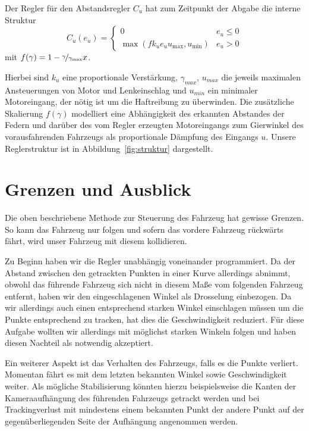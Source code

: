 \documentclass[10pt]{article}
\begin{document}
    Der Regler für den Abstandsregler $C_{u}$ hat zum Zeitpunkt der Abgabe die interne Struktur \[
    C_{u}(e_{u}) = \begin{cases} 0 & e_{u} \leq 0 \\
    \max (fk_{u}e_{u}u_{\max},u_{\min}) &  e_{u} > 0
    \end{cases}
    \]
    mit $f(\gamma) = 1 - \nicefrac{\gamma}{\gamma_{\max}}x$.

    Hierbei sind $k_{u}$ eine proportionale Verstärkung, $\gamma_{max}$, $u_{max}$ die jeweils maximalen Ansteuerungen von Motor und Lenkeinschlag und $u_{min}$ ein minimaler Motoreingang, der nötig ist um die Haftreibung zu überwinden.
    Die zusätzliche Skalierung $f(\gamma)$ modelliert eine Abhängigkeit des erkannten Abstandes der Federn und darüber des vom Regler erzeugten Motoreingangs zum Gierwinkel des vorausfahrenden Fahrzeugs als proportionale Dämpfung des Eingangs $u$.
    Unsere Reglerstruktur ist in Abbildung~\ref{fig:struktur} dargestellt.


\section{Grenzen und Ausblick}
    Die oben beschriebene Methode zur Steuerung des Fahrzeug hat gewisse Grenzen.
    So kann das Fahrzeug nur folgen und sofern das vordere Fahrzeug rückwärts fährt, wird unser Fahrzeug mit diesem kollidieren.

    Zu Beginn haben wir die Regler unabhängig voneinander programmiert.
    Da der Abstand zwischen den getrackten Punkten in einer Kurve allerdings abnimmt, obwohl das führende Fahrzeug sich nicht in diesem Maße vom folgenden Fahrzeug entfernt, haben wir den eingeschlagenen Winkel als Drosselung einbezogen.
    Da wir allerdings auch einen entsprechend starken Winkel einschlagen müssen um die Punkte entsprechend zu tracken, hat dies die Geschwindigkeit reduziert.
    Für diese Aufgabe wollten wir allerdings mit möglichst starken Winkeln folgen und haben diesen Nachteil als notwendig akzeptiert.

    Ein weiterer Aspekt ist das Verhalten des Fahrzeugs, falls es die Punkte verliert.
    Momentan fährt es mit dem letzten bekannten Winkel sowie Geschwindigkeit weiter.
    Als mögliche Stabilisierung könnten hierzu beispielsweise die Kanten der Kameraaufhängung des führenden Fahrzeugs getrackt werden und bei Trackingverlust mit mindestens einem bekannten Punkt der andere Punkt auf der gegenüberliegenden Seite der Aufhängung angenommen werden.
\end{document}
